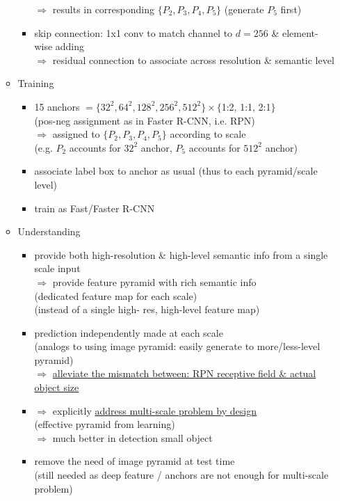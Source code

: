 \begin{itemize}
\begin{itemize}
\begin{itemize}
		$\Rightarrow$ results in corresponding $\{P_2,P_3,P_4,P_5\}$ (generate $P_5$ first)
		\item skip connection: 1x1 conv to match channel to $d=256$ \& element-wise adding \\
		$\Rightarrow$ residual connection to associate across resolution \& semantic level
		\end{itemize}
	\item Training
		\begin{itemize}
		\item 15 anchors $=\{32^2, 64^2, 128^2, 256^2, 512^2\}\times\{$1:2, 1:1, 2:1$\}$ \\
		(pos-neg assignment as in Faster R-CNN, i.e. RPN) \\
		$\Rightarrow$ assigned to $\{P_2,P_3,P_4,P_5\}$ according to scale \\
		(e.g. $P_2$ accounts for $32^2$ anchor, $P_5$ accounts for $512^2$ anchor)
		\item associate label box to anchor as usual (thus to each pyramid/scale level)
		\item train as Fast/Faster R-CNN
		\end{itemize}
	\item Understanding
		\begin{itemize}
		\item provide both high-resolution \& high-level semantic info from a single scale input \\
		$\Rightarrow$ provide feature pyramid with rich semantic info \\
		(dedicated feature map for each scale) \\
		(instead of a single high- res, high-level feature map)
		\item prediction independently made at each scale \\
		(analogs to using image pyramid: easily generate to more/less-level pyramid) \\
		$\Rightarrow$ \underline{alleviate the mismatch between: RPN receptive field \& actual object size}
		\item $\Rightarrow$ explicitly \underline{address multi-scale problem by design} \\
		(effective pyramid from learning) \\
		$\Rightarrow$ much better in detection small object
		\item remove the need of image pyramid at test time \\
		(still needed as deep feature / anchors are not enough for multi-scale problem) \\

\end{itemize}
\end{itemize}
\end{itemize}
